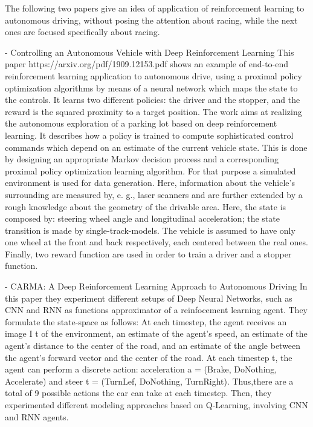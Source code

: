 The following two papers give an idea of application of reinforcement learning to autonomous driving, without posing the attention about racing, while the next ones are focused specifically about racing.

- Controlling an Autonomous Vehicle with Deep Reinforcement Learning
This paper https://arxiv.org/pdf/1909.12153.pdf shows an example of end-to-end reinforcement learning application to autonomous drive, using a proximal policy optimization algorithms by means of a neural network which maps the state to the controls. It learns two different policies: the driver and the stopper, and the reward is the squared proximity to a target position. The work aims at realizing the autonomous exploration of a parking lot based on deep reinforcement learning. It describes how a policy is trained to compute sophisticated control commands which depend on an estimate of the current vehicle state. This is done by designing an appropriate Markov decision process and a corresponding proximal policy optimization learning algorithm. For that purpose a simulated environment is used for data generation. Here, information about the vehicle's surrounding are measured by, e. g., laser scanners and are further extended by a rough knowledge about the geometry of the drivable area.
Here, the state is composed by: steering wheel angle and longitudinal acceleration; the state transition is made by single-track-models. The vehicle is assumed to have only one wheel at the front and back respectively, each centered between the real ones. Finally, two reward function are used in order to train a driver and a stopper function.




- CARMA: A Deep Reinforcement Learning Approach to Autonomous Driving
In this paper they experiment different setups of Deep Neural Networks, such as CNN and RNN as functions approximator of a reinfocement learning agent.
They formulate the state-space as follows: At each timestep, the agent receives an image I t of the environment, an estimate of the agent's speed, an estimate of the agent's distance to the center of the road, and an estimate of the angle between the agent's forward vector and the center of the road. At each timestep t, the agent can perform a discrete action: acceleration a = (Brake, DoNothing, Accelerate) and steer t = (TurnLef, DoNothing, TurnRight). Thus,there are a total of 9 possible actions the car can take at each timestep.
Then, they experimented different modeling approaches based on Q-Learning, involving CNN and RNN agents.


